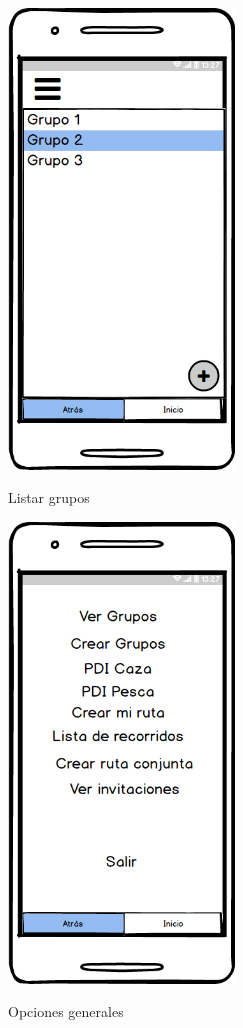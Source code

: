 	\begin{figure}[htbp]
\begin{minipage}[b]{0.5\linewidth} %
\centering
\includegraphics[width=6cm]{maqueta/lista-grupos.png}
 \label{figura1}
\caption{Listar grupos}

\end{minipage}
\hspace{0.5cm} %
\begin{minipage}[b]{0.5\linewidth}
\centering
\includegraphics[width=6cm]{maqueta/opciones.png}
 \label{figura2}
\caption{Opciones generales}

\end{minipage}
\end{figure}
